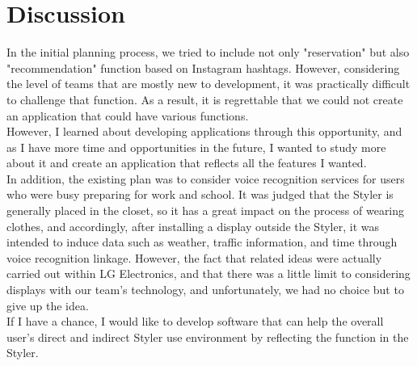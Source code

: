 \documentclass[conference]{IEEEtran}
\begin{document}
\section{Discussion}
In the initial planning process, we tried to include not only "reservation" but also "recommendation" function based on Instagram hashtags. However, considering the level of teams that are mostly new to development, it was practically difficult to challenge that function. As a result, it is regrettable that we could not create an application that could have various functions.\\
However, I learned about developing applications through this opportunity, and as I have more time and opportunities in the future, I wanted to study more about it and create an application that reflects all the features I wanted.\\
In addition, the existing plan was to consider voice recognition services for users who were busy preparing for work and school. It was judged that the Styler is generally placed in the closet, so it has a great impact on the process of wearing clothes, and accordingly, after installing a display outside the Styler, it was intended to induce data such as weather, traffic information, and time through voice recognition linkage. However, the fact that related ideas were actually carried out within LG Electronics, and that there was a little limit to considering displays with our team's technology, and unfortunately, we had no choice but to give up the idea.\\
If I have a chance, I would like to develop software that can help the overall user's direct and indirect Styler use environment by reflecting the function in the Styler.\\

\clearpage
\thispagestyle{empty}

\listoftables
\vspace{2\baselineskip} 
\listoffigures

\newpage
{}
\end{document}
